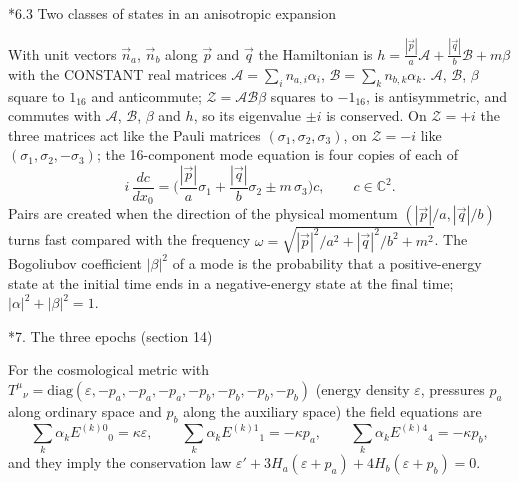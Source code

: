 \documentclass[10pt,a4paper]{article}
\makeatletter
\renewcommand\section{\@startsection{section}{1}{\z@}{-3.5ex \@plus -1ex \@minus -.2ex}{2.3ex \@plus.2ex}{\normalfont\Large\bfseries\raggedright}}
\renewcommand\subsection{\@startsection{subsection}{2}{\z@}{-3.25ex\@plus -1ex \@minus -.2ex}{1.5ex \@plus .2ex}{\normalfont\large\bfseries\raggedright}}
\makeatother
\begin{document}
\subsection*{6.3 Two classes of states in an anisotropic expansion}
With unit vectors $\vec n_a$, $\vec n_b$ along $\vec p$ and $\vec q$ the Hamiltonian is $h=\frac{|\vec p|}{a}\mathcal A+\frac{|\vec q|}{b}\mathcal B+m\beta$ with the CONSTANT real matrices $\mathcal A=\sum_i n_{a,i}\alpha_i$, $\mathcal B=\sum_k n_{b,k}\alpha_k$. $\mathcal A$, $\mathcal B$, $\beta$ square to $1_{16}$ and anticommute; $\mathcal Z=\mathcal A\mathcal B\beta$ squares to $-1_{16}$, is antisymmetric, and commutes with $\mathcal A$, $\mathcal B$, $\beta$ and $h$, so its eigenvalue $\pm i$ is conserved. On $\mathcal Z=+i$ the three matrices act like the Pauli matrices $(\sigma_1,\sigma_2,\sigma_3)$, on $\mathcal Z=-i$ like $(\sigma_1,\sigma_2,-\sigma_3)$; the 16-component mode equation is four copies of each of
\begin{equation*}
i\,\frac{dc}{dx_0}=\Big(\frac{|\vec p|}{a}\sigma_1+\frac{|\vec q|}{b}\sigma_2\pm m\,\sigma_3\Big)c,\qquad c\in\mathbb C^2 .
\end{equation*}
Pairs are created when the direction of the physical momentum $(|\vec p|/a,|\vec q|/b)$ turns fast compared with the frequency $\omega=\sqrt{|\vec p|^2/a^2+|\vec q|^2/b^2+m^2}$. The Bogoliubov coefficient $|\beta|^2$ of a mode is the probability that a positive-energy state at the initial time ends in a negative-energy state at the final time; $|\alpha|^2+|\beta|^2=1$.

\section*{7. The three epochs (section 14)}
For the cosmological metric with $T^\mu{}_\nu=\mathrm{diag}(\varepsilon,-p_a,-p_a,-p_a,-p_b,-p_b,-p_b,-p_b)$ (energy density $\varepsilon$, pressures $p_a$ along ordinary space and $p_b$ along the auxiliary space) the field equations are
\begin{equation*}
\sum_k\alpha_kE^{(k)0}{}_0=\kappa\varepsilon,\qquad \sum_k\alpha_kE^{(k)1}{}_1=-\kappa p_a,\qquad \sum_k\alpha_kE^{(k)4}{}_4=-\kappa p_b,
\end{equation*}
and they imply the conservation law $\varepsilon'+3H_a(\varepsilon+p_a)+4H_b(\varepsilon+p_b)=0$.
\end{document}
